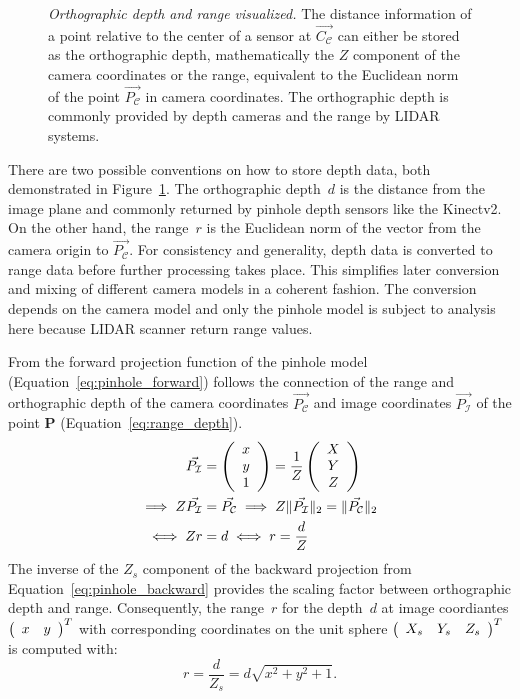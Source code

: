 \begin{figure}[tb]
    \scalebox{0.8}{%
    
    }
    \caption[Orthographic depth and range visualized]{\emph{Orthographic depth and range visualized.} The distance information of a point relative to the center of a sensor at $\vec{C_\mathcal{C}}$ can either be stored as the orthographic depth, mathematically the $Z$ component of the camera coordinates or the range, equivalent to the Euclidean norm of the point $\vec{P_\mathcal{C}}$ in camera coordinates. The orthographic depth is commonly provided by depth cameras and the range by \acrshort{LIDAR} systems.}
    \label{fig:range_depth}
\end{figure}
There are two possible conventions on how to store depth data, both demonstrated in Figure~\ref{fig:range_depth}.
The orthographic depth~$d$ is the distance from the image plane and commonly returned by pinhole depth sensors like the Kinectv2\cite{wasenmuller_accv2016}.
On the other hand, the range~$r$ is the Euclidean norm of the vector from the camera origin to $\vec{P_\mathcal{C}}$.
For consistency and generality, depth data is converted to range data before further processing takes place.
This simplifies later conversion and mixing of different camera models in a coherent fashion.
The conversion depends on the camera model and only the pinhole model is subject to analysis here because \acrshort{LIDAR} scanner return range values.

From the forward projection function of the pinhole model (Equation~\ref{eq:pinhole_forward}) follows the connection of the range and orthographic depth of the camera coordinates $\vec{P_\mathcal{C}}$ and image coordinates $\vec{P_\mathcal{I}}$ of the point $\mathbf{P}$ (Equation~\ref{eq:range_depth}).
\begin{equation}
\begin{aligned}
    \vec{P_\mathcal{I}} &= \left(\begin{array}{c} x \\ y \\ 1 \end{array}\right) = \frac{1}{Z}\left(\begin{array}{c} X \\ Y \\ Z \end{array}\right) \\
    \implies Z \vec{P_\mathcal{I}} &= \vec{P_\mathcal{C}} \implies Z \lVert\vec{P_\mathcal{I}}\rVert_{2} = \lVert\vec{P_\mathcal{C}}\rVert_{2} \\
    \iff Z r &= d \iff r = \frac{d}{Z}
    \label{eq:range_depth}
\end{aligned}
\end{equation}
The inverse of the $Z_{s}$ component of the backward projection from Equation~\ref{eq:pinhole_backward} provides the scaling factor between orthographic depth and range.
Consequently, the range~$r$ for the depth~$d$ at image coordiantes $\left(\begin{array}{cc} x & y \end{array}\right)^T$ with corresponding coordinates on the unit sphere $\left(\begin{array}{ccc} X_s & Y_s & Z_s \end{array}\right)^T$ is computed with:
\begin{equation}
    r = \frac{d}{Z_s} = d \sqrt{x^2 + y^2 + 1}\text{.}
\end{equation}
